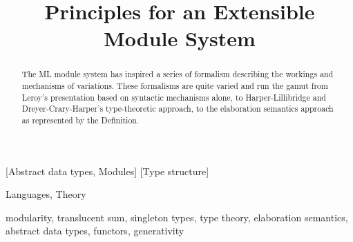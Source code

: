 \documentclass[9pt]{sigplanconf}
\begin{document}
	
\title{Principles for an Extensible Module System}
\maketitle

\begin{abstract}
The ML module system has inspired a series of formalism describing the workings and mechanisms of variations. These formalisms are quite varied and run the gamut from Leroy's presentation based on syntactic mechanisms alone, to Harper-Lillibridge and Dreyer-Crary-Harper's type-theoretic approach, to the elaboration semantics approach as represented by the Definition. 	
\end{abstract}

[Abstract data types, Modules] 
[Type structure]

\terms 
Languages, Theory

\keywords
modularity, translucent sum, singleton types, type theory, elaboration semantics, abstract data types, functors, generativity
\end{document}
